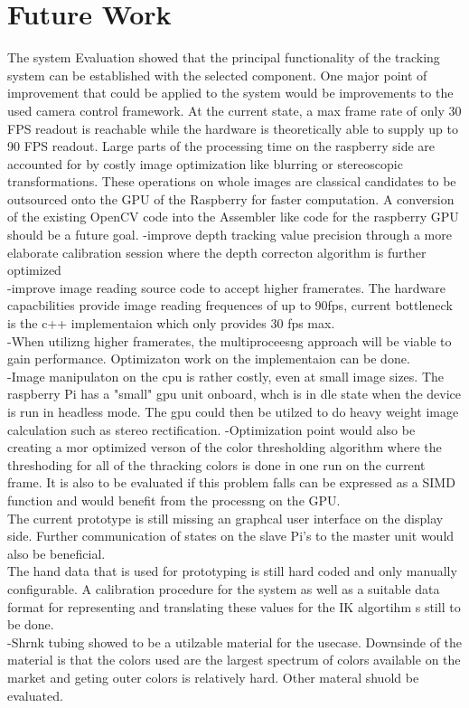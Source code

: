 \chapter{Future Work}
The system Evaluation showed that the principal functionality of the tracking system can be established with the selected component. One major point of improvement that could be applied to the system would be improvements to the used camera control framework. At the current state, a max frame rate of only 30 FPS readout is reachable while the hardware is theoretically able to supply up to 90 FPS readout. 
Large parts of the processing time on the raspberry side are accounted for by costly image optimization like blurring or stereoscopic transformations. These operations on whole images are classical candidates to be outsourced onto the GPU of the Raspberry for faster computation. A conversion of the existing OpenCV code into the Assembler like code for the raspberry GPU should be a future goal.
-improve depth tracking value precision through a more elaborate calibration session where the depth correcton algorithm is further optimized
\\
-improve image reading source code to accept higher framerates. The hardware capacbilities provide image reading frequences of up to 90fps, current bottleneck is the c++ implementaion which only provides 30 fps max.
\\
-When utilizng higher framerates, the multiproceesng approach will be viable to gain performance. Optimizaton work on the implementaion can be done.\\
-Image manipulaton on the cpu is rather costly, even at small image sizes. The raspberry Pi has a "small" gpu unit onboard, whch is in dle state when the device is run in headless mode. The gpu could then be utilzed to do heavy weight image calculation such as stereo rectification.
-Optimization point would also be creating a mor optimized verson of the color thresholding algorithm where the threshoding for all of the thracking colors is done in one run on the current frame. It is also to be evaluated if this problem falls can be expressed as a SIMD function and would benefit from the processng on the GPU.
\\
The current prototype is still missing an graphcal user interface on the display side. Further communication of states on the slave Pi's to the master unit would also be beneficial.
\\
The hand data that is used for prototyping is still hard coded and only manually configurable. A calibration procedure for the system as well as a suitable data format for representing and translating these values for the IK algortihm s still to be done.
\\
-Shrnk tubing showed to be a utilzable material for the usecase. Downsinde of the material is that the colors used are the largest spectrum of colors available on the market and geting outer colors is relatively hard. Other materal shuold be evaluated.

